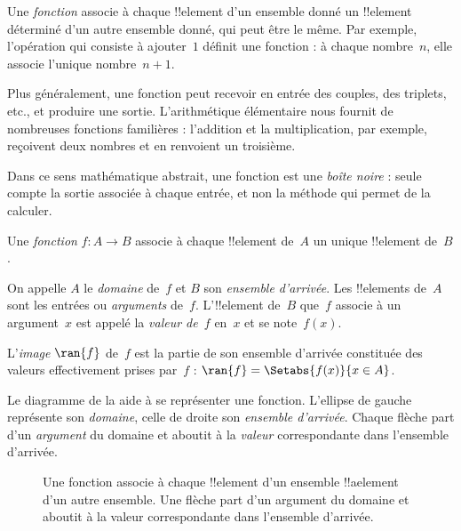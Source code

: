 \documentclass[../../../include/open-logic-section]{subfiles}
\begin{document}

\begin{explain}
Une \emph{fonction} associe à chaque !!{element} d’un ensemble donné
un !!{element} déterminé d’un autre ensemble donné, qui peut être le même.
Par exemple, l’opération qui consiste à ajouter~$1$ définit une fonction :
à chaque nombre~$n$, elle associe l’unique nombre~$n+1$.

Plus généralement, une fonction peut recevoir en entrée des couples,
des triplets, etc., et produire une sortie. L’arithmétique élémentaire
nous fournit de nombreuses fonctions familières : l’addition et la
multiplication, par exemple, reçoivent deux nombres et en renvoient un troisième.

Dans ce sens mathématique abstrait, une fonction est une \emph{boîte noire} :
seule compte la sortie associée à chaque entrée, et non la méthode
qui permet de la calculer.
\end{explain}

\begin{defn}[Fonction]
Une \emph{fonction} $f \colon A \to B$ associe à chaque !!{element}
de~$A$ un unique !!{element} de~$B$.

On appelle $A$ le \emph{domaine} de~$f$ et $B$ son \emph{ensemble d’arrivée}.
Les !!{element}s de~$A$ sont les entrées ou \emph{arguments} de~$f$.
L’!!{element} de~$B$ que~$f$ associe à un argument~$x$ est appelé
la \emph{valeur de~$f$} en~$x$ et se note~$f(x)$.

L’\emph{image} $\ran{f}$ de~$f$ est la partie de son ensemble d’arrivée
constituée des valeurs effectivement prises par~$f$ :
$\ran{f} = \Setabs{f(x)}{x \in A}$.
\end{defn}

Le diagramme de la  aide à se représenter une fonction.
L’ellipse de gauche représente son \emph{domaine}, celle de droite
son \emph{ensemble d’arrivée}. Chaque flèche part d’un \emph{argument}
du domaine et aboutit à la \emph{valeur} correspondante dans l’ensemble d’arrivée.

\begin{figure}
  \caption{Une fonction associe à chaque !!{element} d’un ensemble
    !!a{element} d’un autre ensemble. Une flèche part d’un argument
    du domaine et aboutit à la valeur correspondante dans l’ensemble d’arrivée.}
\end{figure}
\end{document}
